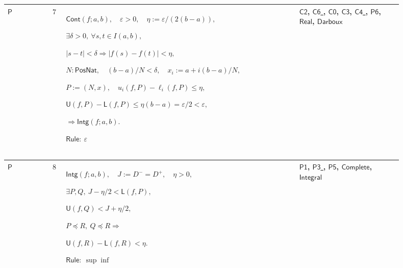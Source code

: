 \documentclass[12pt,reqno]{amsart}
\theoremstyle{blueplain}
\numberwithin{equation}{section}
\begin{document}
{\scriptsize \setlength{\parskip}{0pt}\nointerlineskip
\noindent 
\begin{tabular}{|@{}>{\centering\arraybackslash}m{0.10658\linewidth}|>{\centering\arraybackslash}m{0.03553\linewidth}|>{\centering\arraybackslash}m{0.52105\linewidth}|>{\centering\arraybackslash}m{0.23684\linewidth}|}
\hline
\hypertarget{proof:P7}{$\displaystyle \mathsf{P}$} & $\displaystyle 7$ & $%
\displaystyle \mathsf{Cont}(f;a,b),\quad\varepsilon>0,\quad\eta:=%
\varepsilon/(2(b-a)),$\par$\displaystyle \exists\delta>0,\ \forall s,t\in
I(a,b),$\par$\displaystyle |s-t|<\delta\Rightarrow|f(s)-f(t)|<\eta,$\par$%
\displaystyle N:\mathsf{PosNat},\quad(b-a)/N<\delta,\quad x_i:=a+i(b-a)/N,$%
\par$\displaystyle P:=(N,x),\quad u_i(f,P)-\ell_i(f,P)\le\eta,$\par$%
\displaystyle \mathsf{U}(f,P)-\mathsf{L}(f,P)\le\eta(b-a)=\varepsilon/2<%
\varepsilon,$\par$\displaystyle \Rightarrow\mathsf{Intg}(f;a,b).$\par$%
\displaystyle \mathsf{Rule}:\ \varepsilon$ & \hyperlink{proof:C2}{$%
\displaystyle \mathsf{C2}$}, \hyperlink{proof:C6}{$\displaystyle \mathsf{C6}$%
}, \hyperlink{proof:C0}{$\displaystyle \mathsf{C0}$}, \hyperlink{proof:C3}{$%
\displaystyle \mathsf{C3}$}, \hyperlink{proof:C4}{$\displaystyle \mathsf{C4}$%
}, \hyperlink{proof:P6}{$\displaystyle \mathsf{P6}$}, \hyperlink{ax:Real}{$%
\displaystyle \mathsf{Real}$}, \hyperlink{def:Darboux}{$\displaystyle 
\mathsf{Darboux}$} \\ \hline
\end{tabular}%
}

{\scriptsize \setlength{\parskip}{0pt}\nointerlineskip
\noindent 
\begin{tabular}{|@{}>{\centering\arraybackslash}m{0.10658\linewidth}|>{\centering\arraybackslash}m{0.03553\linewidth}|>{\centering\arraybackslash}m{0.52105\linewidth}|>{\centering\arraybackslash}m{0.23684\linewidth}|}
\hline
\hypertarget{proof:P8}{$\displaystyle \mathsf{P}$} & $\displaystyle 8$ & $%
\displaystyle \mathsf{Intg}(f;a,b),\quad J:=D^-=D^+,\quad\eta>0,$\par$%
\displaystyle \exists P,Q,\ J-\eta/2<\mathsf{L}(f,P),$\par$\displaystyle 
\mathsf{U}(f,Q)<J+\eta/2,$\par$\displaystyle P\preceq R,\ Q\preceq
R\Rightarrow$\par$\displaystyle \mathsf{U}(f,R)-\mathsf{L}(f,R)<\eta.$\par$%
\displaystyle \mathsf{Rule}:\ \sup\inf$ & \hyperlink{proof:P1}{$%
\displaystyle \mathsf{P1}$}, \hyperlink{proof:P3}{$\displaystyle \mathsf{P3}$%
}, \hyperlink{proof:P5}{$\displaystyle \mathsf{P5}$}, \hyperlink{ax:Complete}%
{$\displaystyle \mathsf{Complete}$}, \hyperlink{def:Integral}{$\displaystyle 
\mathsf{Integral}$} \\ \hline
\end{tabular}%
}
\end{document}
